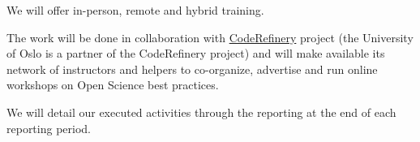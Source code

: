 \begin{task}[
  title=Training Workshops for more reproducible science,
  id=workshops,
  lead=UIO,
  PM=9,
  wphases={12-36!.25},
  partners={SRL,MP,IFR}
]
\begin{compactitem}
   \item We will offer in-person, remote and hybrid training.

   \item The work will be done in collaboration with
     \href{https://coderefinery.org}{CodeRefinery} project (the University of Oslo is a partner of the CodeRefinery project) 
     and will make available its network of instructors and helpers
     to co-organize, advertise and run online workshops on Open Science best practices. 

  \item We will detail our executed activities through the reporting at the end of
    each reporting period.
  \end{compactitem}
\end{task}
